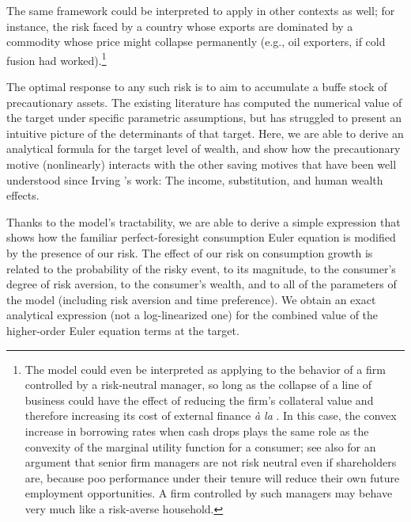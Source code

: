 \documentclass[titlepage,abstract]{\econtex}\newcommand{\texname}{ctDiscrete}
\begin{document}
The same framework could be interpreted to apply in other contexts as well; for instance,
the risk faced by a country whose exports are dominated by a commodity
whose price might collapse permanently (e.g., oil exporters, if cold
fusion had worked).\footnote{ The model could even be interpreted as
  applying to the behavior of a firm controlled by a risk-neutral
  manager, so long as the collapse of a line of business could have
  the effect of reducing the firm's collateral value and therefore
  increasing its cost of external finance \textit{\`{a} la}
  \cite{bernanke&gertler&gilchrist:accellerator}. In this case, the
  convex increase in borrowing rates when cash drops plays the same
  role as the convexity of the marginal utility function for a
  consumer; see also \cite{bszHumK} for an argument that senior firm
  managers are not risk neutral even if shareholders are, because poo
  performance under their tenure will reduce their own future
  employment opportunities.  A firm controlled by such managers may
  behave very much like a risk-averse household.}

The optimal response to any such risk is to aim to accumulate a buffe
stock of precautionary assets.  The existing literature has computed the
numerical value of the target under specific parametric assumptions,
but has struggled to present an intuitive picture of the determinants
of that target.  Here, we are able to derive an analytical
formula for the target level of wealth, and show how the
precautionary motive (nonlinearly) interacts with the other saving motives that have
been well understood since Irving \cite{fisherInterestTheory}'s work:
The income, substitution, and human wealth effects.

Thanks to the model's tractability, we are able to derive a simple
expression that shows how the familiar perfect-foresight consumption
Euler equation is modified by the presence of our risk.  The effect of our risk on consumption growth
is related to the probability of the risky event, to its magnitude, to
the consumer's degree of risk aversion, to the consumer's wealth, and
to all of the parameters of the model (including risk aversion and
time preference). We obtain an exact analytical expression (not a
log-linearized one) for the combined value of the higher-order Euler equation terms
at the target.
\end{document}
